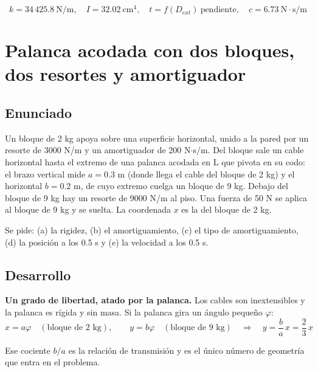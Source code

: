 \documentclass[12pt,letterpaper]{article}
\begin{document}
\begin{equation}
\boxed{\;k = 34\,425.8\ \text{N/m}, \quad I = 32.02\ \text{cm}^4, \quad
t = f(D_{ext})\ \text{pendiente}, \quad c = 6.73\ \text{N}\cdot\text{s/m}\;}
\end{equation}

\newpage
\section{Palanca acodada con dos bloques, dos resortes y amortiguador}

\subsection{Enunciado}

Un bloque de 2 kg apoya sobre una superficie horizontal, unido a la pared por un
resorte de 3000 N/m y un amortiguador de 200 N$\cdot$s/m. Del bloque sale un cable
horizontal hasta el extremo de una palanca acodada en L que pivota en su codo: el
brazo vertical mide $a = 0.3$ m (donde llega el cable del bloque de 2 kg) y el
horizontal $b = 0.2$ m, de cuyo extremo cuelga un bloque de 9 kg. Debajo del bloque de
9 kg hay un resorte de 9000 N/m al piso. Una fuerza de 50 N se aplica al bloque de
9 kg y se suelta. La coordenada $x$ es la del bloque de 2 kg.

Se pide: (a) la rigidez, (b) el amortiguamiento, (c) el tipo de amortiguamiento,
(d) la posición a los 0.5 s y (e) la velocidad a los 0.5 s.

\subsection{Desarrollo}

\textbf{Un grado de libertad, atado por la palanca.} Los cables son inextensibles y la
palanca es rígida y sin masa. Si la palanca gira un ángulo pequeño $\varphi$:
\begin{equation}
x = a\varphi \quad (\text{bloque de 2 kg}), \qquad
y = b\varphi \quad (\text{bloque de 9 kg})
\quad\Longrightarrow\quad
y = \frac{b}{a}\,x = \frac{2}{3}\,x
\end{equation}

Ese cociente $b/a$ es la relación de transmisión y es el único número de geometría que
entra en el problema.
\end{document}
